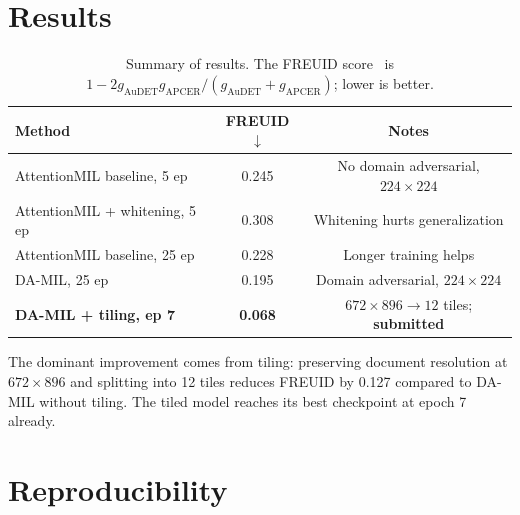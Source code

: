 \documentclass[11pt,a4paper]{article}
\begin{document}
\section{Results}
\label{sec:results}

\begin{table}[h]
  \centering
  \caption{Summary of results. The FREUID score~\cite{freuid2026} is $1 - 2 g_\text{AuDET} g_\text{APCER} / (g_\text{AuDET} + g_\text{APCER})$; lower is better.}
  \label{tab:results}
  \begin{tabular}{lcc}
    \toprule
    Method & FREUID $\downarrow$ & Notes \\
    \midrule
    AttentionMIL baseline, 5 ep    & 0.245 & No domain adversarial, $224\times224$ \\
    AttentionMIL + whitening, 5 ep & 0.308 & Whitening hurts generalization \\
    AttentionMIL baseline, 25 ep   & 0.228 & Longer training helps \\
    DA-MIL, 25 ep                  & 0.195 & Domain adversarial, $224\times224$ \\
    \midrule
    \textbf{DA-MIL + tiling, ep 7} & \textbf{0.068} & $672\times896 \to 12$ tiles; \textbf{submitted} \\
    \bottomrule
  \end{tabular}
\end{table}

The dominant improvement comes from tiling: preserving document resolution at $672\times896$ and splitting into 12 tiles reduces FREUID by 0.127 compared to DA-MIL without tiling. The tiled model reaches its best checkpoint at epoch 7 already.

\section{Reproducibility}
\label{sec:repro}
\end{document}
